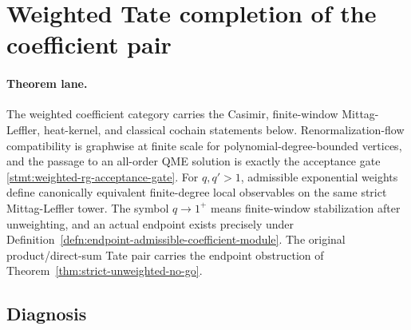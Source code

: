 
\section*{Weighted Tate completion of the coefficient pair}

\paragraph{Theorem lane.}
The weighted coefficient category carries the Casimir, finite-window
Mittag-Leffler, heat-kernel, and classical cochain statements below.
Renormalization-flow compatibility is graphwise at finite scale for
polynomial-degree-bounded vertices, and the passage to an all-order QME
solution is exactly the acceptance gate
\ref{stmt:weighted-rg-acceptance-gate}.  For \(q,q'>1\), admissible
exponential weights define canonically equivalent finite-degree local
observables on the same strict Mittag-Leffler tower.  The symbol
\(q\to1^+\) means finite-window stabilization after unweighting, and an
actual endpoint exists precisely under
Definition~\ref{defn:endpoint-admissible-coefficient-module}.  The
original product/direct-sum Tate pair carries the endpoint obstruction
of Theorem~\ref{thm:strict-unweighted-no-go}.

\subsection*{Diagnosis}

